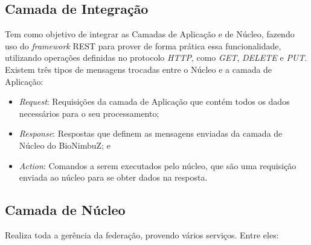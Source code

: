 \subsection{Camada de Integração} Tem como objetivo de integrar as Camadas de Aplicação e de Núcleo, fazendo uso do \textit{framework} \acrshort{REST} para prover de forma prática essa funcionalidade, utilizando operações definidas no protocolo \textit{HTTP}, como \textit{GET}, \textit{DELETE} e \textit{PUT}.
Existem três tipos de mensagens trocadas entre o Núcleo e a camada de Aplicação:
\begin{itemize}
	\item \textit{Request}: Requisições da camada de Aplicação que contém todos os dados necessários para o seu processamento;
	\item \textit{Response}: Respostas que definem as mensagens enviadas da camada de Núcleo do BioNimbuZ; e
	\item \textit{Action}: Comandos a serem executados pelo núcleo, que são uma requisição enviada ao núcleo para se obter dados na resposta.
\end{itemize}
	
	\subsection{Camada de Núcleo} Realiza toda a gerência da federação, provendo vários serviços. Entre eles:

